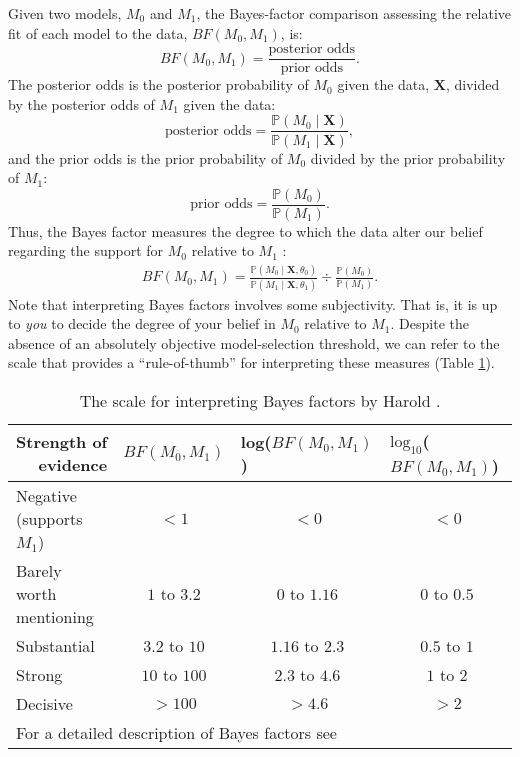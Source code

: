  
Given two models, $M_0$ and $M_1$, the Bayes-factor comparison assessing the relative fit of each model to the data, $BF(M_0,M_1)$, is:
$$BF(M_0,M_1) = \frac{\mbox{posterior odds}}{\mbox{prior odds}}.$$
The posterior odds is the posterior probability of $M_0$ given the data, $\mathbf X$, divided by the posterior odds of $M_1$ given the data:
$$\mbox{posterior odds} = \frac{\mathbb{P}(M_0 \mid \mathbf X)}{\mathbb{P}(M_1 \mid \mathbf X)},$$
and the prior odds is the prior probability of $M_0$ divided by the prior probability of $M_1$:
$$\mbox{prior odds} = \frac{\mathbb{P}(M_0)}{\mathbb{P}(M_1)}.$$
Thus, the Bayes factor measures the degree to which the data alter our belief regarding the support for $M_0$ relative to $M_1$ \citep{Lavine1999}:
\begin{align}\label{BFeq1}
BF(M_0,M_1) = \frac{\mathbb{P}(M_0 \mid \mathbf X, \theta_0)}{\mathbb{P}(M_1 \mid \mathbf X, \theta_1)} \div \frac{\mathbb{P}(M_0)}{\mathbb{P}(M_1)}. 
\end{align}
Note that interpreting Bayes factors involves some subjectivity.
That is, it is up to \textsl{you} to decide the degree of your belief in $M_0$ relative to $M_1$. 
Despite the absence of an absolutely objective model-selection threshold, we can refer to the scale \citep[outlined by][]{Jeffreys1961} that provides a ``rule-of-thumb'' for interpreting these measures (Table \ref{bftable}).
\begin{table}[h]
\centering
\caption{\small The scale for interpreting Bayes factors by Harold \citet{Jeffreys1961}.} 
\label{bftable}
\begin{tabular}{l c c c}
\hline
\multicolumn{1}{r}{{Strength of evidence}} & \multicolumn{1}{l}{\textbf{$BF(M_0, M_1)$}} & \multicolumn{1}{l}{\textbf{log($BF(M_0, M_1)$)}} &  \multicolumn{1}{l}{\textbf{$\text{log}_{10}$($BF(M_0, M_1)$)}}\\ 
\hline
Negative (supports $M_1$) & $<1$ & $<0$ & $<0$\\
Barely worth mentioning & $1$ to $3.2$ & $0$ to $1.16$ & $0$ to $0.5$\\
Substantial & $3.2$ to $10$ & $1.16$ to $2.3$ & $0.5$ to $1$ \\
Strong & $10$ to $100$ & $2.3$ to $4.6$ & $1$ to $2$ \\
Decisive& $>100$ & $>4.6$ & $>2$ \\
\hline
\multicolumn{3}{l}{{\scriptsize{For a detailed description of Bayes factors see \citet{Kass1995}}}} 
\end{tabular}
\end{table}


